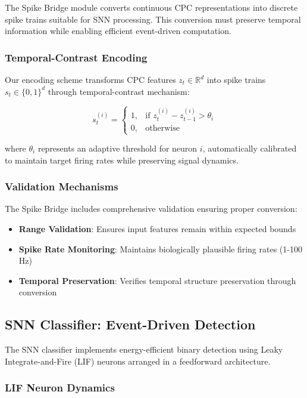 \documentclass[12pt,a4paper]{article}
\begin{document}
The Spike Bridge module converts continuous CPC representations into discrete spike trains suitable for SNN processing. This conversion must preserve temporal information while enabling efficient event-driven computation.

\subsubsection{Temporal-Contrast Encoding}

Our encoding scheme transforms CPC features $z_t \in \mathbb{R}^d$ into spike trains $s_t \in \{0,1\}^d$ through temporal-contrast mechanism:

\begin{equation}
s_t^{(i)} = \begin{cases}
1, & \text{if } z_t^{(i)} - z_{t-1}^{(i)} > \theta_i \\
0, & \text{otherwise}
\end{cases}
\end{equation}

where $\theta_i$ represents an adaptive threshold for neuron $i$, automatically calibrated to maintain target firing rates while preserving signal dynamics.

\subsubsection{Validation Mechanisms}

The Spike Bridge includes comprehensive validation ensuring proper conversion:
\begin{itemize}
\item \textbf{Range Validation}: Ensures input features remain within expected bounds
\item \textbf{Spike Rate Monitoring}: Maintains biologically plausible firing rates (1-100 Hz)
\item \textbf{Temporal Preservation}: Verifies temporal structure preservation through conversion
\end{itemize}

\subsection{SNN Classifier: Event-Driven Detection}

The SNN classifier implements energy-efficient binary detection using Leaky Integrate-and-Fire (LIF) neurons arranged in a feedforward architecture.

\subsubsection{LIF Neuron Dynamics}
\end{document}
